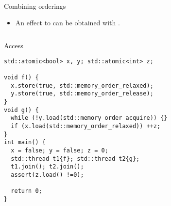 \begin{frame}[fragile]{Combining orderings}
\begin{itemize}
\item An  effect to  
      can be obtained with .
\end{itemize}
\begin{columns}

\begin{column}{.5\textwidth}
\begin{block}{Access}
\begin{lstlisting}[basicstyle=\tiny]
std::atomic<bool> x, y; std::atomic<int> z;

void f() {
  x.store(true, std::memory_order_relaxed);
  y.store(true, std::memory_order_release);
}
void g() {
  while (!y.load(std::memory_order_acquire)) {}
  if (x.load(std::memory_order_relaxed)) ++z;
}
int main() {
  x = false; y = false; z = 0;
  std::thread t1{f}; std::thread t2{g};
  t1.join(); t2.join();
  assert(z.load() !=0);

  return 0;
}
\end{lstlisting}
\end{block}
\end{column}

\begin{column}{.5\textwidth}

\end{column}

\end{columns}
\end{frame}

